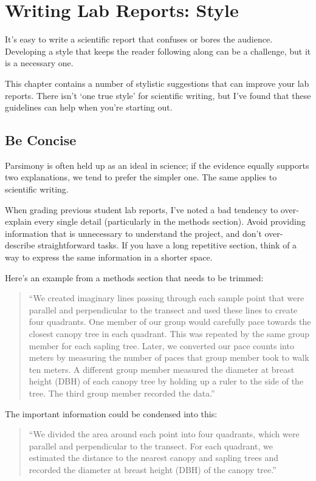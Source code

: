 \documentclass[]{book}
\begin{document}
\chapter{Writing Lab Reports: Style}\label{style}

It's easy to write a scientific report that confuses or bores the
audience. Developing a style that keeps the reader following along can
be a challenge, but it is a necessary one.

This chapter contains a number of stylistic suggestions that can improve
your lab reports. There isn't `one true style' for scientific writing,
but I've found that these guidelines can help when you're starting out.

\section{Be Concise}\label{be-concise}

Parsimony is often held up as an ideal in science; if the evidence
equally supports two explanations, we tend to prefer the simpler one.
The same applies to scientific writing.

When grading previous student lab reports, I've noted a bad tendency to
over-explain every single detail (particularly in the methods section).
Avoid providing information that is unnecessary to understand the
project, and don't over-describe straightforward tasks. If you have a
long repetitive section, think of a way to express the same information
in a shorter space.

Here's an example from a methods section that needs to be trimmed:

\begin{quote}
``We created imaginary lines passing through each sample point that were
parallel and perpendicular to the transect and used these lines to
create four quadrants. One member of our group would carefully pace
towards the closest canopy tree in each quadrant. This was repeated by
the same group member for each sapling tree. Later, we converted our
pace counts into meters by measuring the number of paces that group
member took to walk ten meters. A different group member measured the
diameter at breast height (DBH) of each canopy tree by holding up a
ruler to the side of the tree. The third group member recorded the
data.''
\end{quote}

The important information could be condensed into this:

\begin{quote}
``We divided the area around each point into four quadrants, which were
parallel and perpendicular to the transect. For each quadrant, we
estimated the distance to the nearest canopy and sapling trees and
recorded the diameter at breast height (DBH) of the canopy tree.''
\end{quote}
\end{document}
